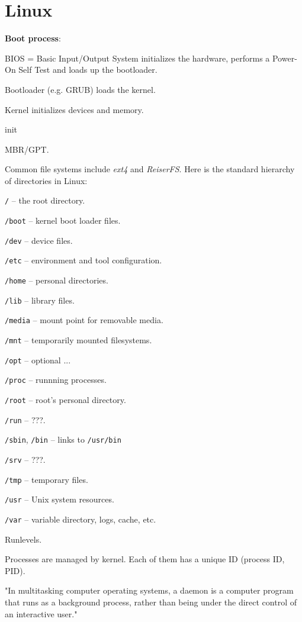 \section{Linux}
\textbf{Boot process}:
\begin{compactenum}
	\item BIOS = Basic Input/Output System initializes the hardware, performs a Power-On Self Test and loads up the bootloader.
	\item Bootloader (e.g. GRUB) loads the kernel.
	\item Kernel initializes devices and memory.
	\item init
\end{compactenum}

MBR/GPT. 

Common file systems include \emph{ext4} and \emph{ReiserFS}.
Here is the standard hierarchy of directories in Linux:
\begin{compactenum}
\item \texttt{/} -- the root directory.
\item \texttt{/boot} -- kernel boot loader files.
\item \texttt{/dev} -- device files.
\item \texttt{/etc} -- environment and tool configuration.
\item \texttt{/home} -- personal directories.
\item \texttt{/lib} -- library files.
\item \texttt{/media} -- mount point for removable media.
\item \texttt{/mnt} -- temporarily mounted filesystems.
\item \texttt{/opt} -- optional ...
\item \texttt{/proc} -- runnning processes.
\item \texttt{/root} -- root's personal directory.
\item \texttt{/run} -- ???.
\item \texttt{/sbin}, \texttt{/bin} -- links to \texttt{/usr/bin}
\item \texttt{/srv} -- ???.
\item \texttt{/tmp} --  temporary files.
\item \texttt{/usr} -- Unix system resources.
\item \texttt{/var} -- variable directory, logs, cache, etc.
\end{compactenum}

Runlevels.

Processes are managed by kernel. Each of them has a unique ID (process ID, PID).

"In multitasking computer operating systems, a daemon is a computer program that runs as a background process, rather than being under the direct control of an interactive user."